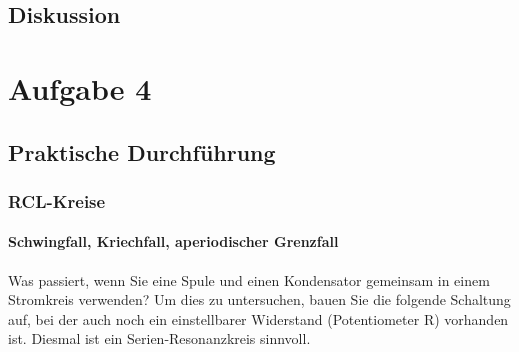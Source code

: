 \documentclass[12pt]{scrartcl}
\begin{document}
\subsection{Diskussion}
\section{Aufgabe 4}
\subsection{Praktische Durchführung}
\subsubsection{RCL-Kreise}
\paragraph{Schwingfall, Kriechfall, aperiodischer Grenzfall}
Was passiert, wenn Sie eine Spule und einen Kondensator gemeinsam in einem Stromkreis verwenden? Um dies zu untersuchen, bauen Sie die folgende Schaltung auf, bei der auch noch ein einstellbarer Widerstand (Potentiometer R) vorhanden ist. Diesmal ist ein Serien-Resonanzkreis sinnvoll.
\end{document}
